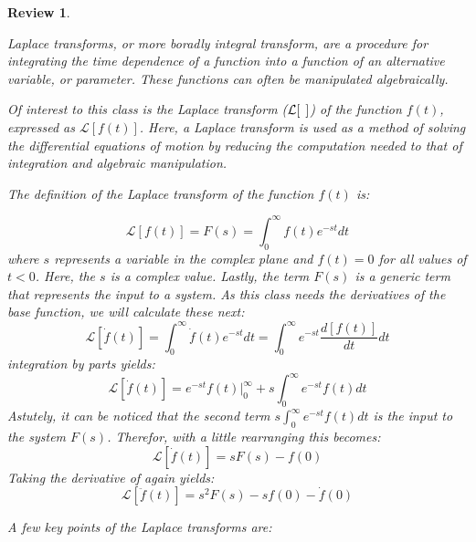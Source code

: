 \documentclass[12pt,letter]{article}
\numberwithin{ex}{section} %
\newtheorem{re}{Review}
\numberwithin{re}{section} %
\newenvironment{review}{\begin{mdframed}[middlelinewidth=2mm,roundcorner=20pt]\begin{re}\normalfont}{\end{re}\end{mdframed}}
\newcommand{\Laplace}[1]{\ensuremath{\mathcal{L}{\left[#1\right]}}}
\begin{document}
\begin{review}
	\label{sec:Laplace_review}
				
		Laplace transforms, or more boradly integral transform, are a procedure for integrating the time dependence of a function into a function of an alternative variable, or parameter. These functions can often be manipulated algebraically. 
		
		Of interest to this class is the Laplace transform ($\Laplace{\hspace{1ex}}$) of the function $f(t)$, expressed as $\Laplace{f(t)}$. Here, a Laplace transform is used as a method of solving the differential equations of motion by reducing the computation needed to that of integration and algebraic manipulation. 
		
		The definition of the Laplace transform of the function $f(t)$ is:
		
		\begin{equation}
				\Laplace{f(t)} = F(s) = \int_{0}^{\infty} f(t)e^{-st}dt
		\end{equation}
		where $s$ represents a variable in the complex plane and $f(t)=0$ for all values of $t<0$. Here, the $s$ is a complex value. Lastly, the term $F(s)$ is a generic term that  represents the input to a system. As this class needs the derivatives of the base function, we will calculate these next:
		\begin{equation}
			\Laplace{\dot{f}(t)} = \int_{0}^{\infty} \dot{f}(t)e^{-st}dt = \int_{0}^{\infty} e^{-st}\frac{d[f(t)]}{dt}dt 
		\end{equation}		
		integration by parts yields:
		\begin{equation}
			\Laplace{\dot{f}(t)} = e^{-st}f(t)\Big|_0^\infty+s\int_{0}^{\infty}e^{-st}f(t)dt
		\end{equation}
		Astutely, it can be noticed that the second term $s\int_{0}^{\infty}e^{-st}f(t)dt$
		is the input to the system $F(s)$. Therefor, with a little rearranging this becomes:
		\begin{equation}
			\Laplace{\dot{f}(t)} = sF(s)-f(0)
		\end{equation}
		Taking the derivative of again yields:
		\begin{equation}
			\Laplace{\ddot{f}(t)} = s^2F(s)-sf(0)-\dot{f}(0)
		\end{equation}
		
		A few key points of the Laplace transforms are:
				

\end{review}
\end{document}
